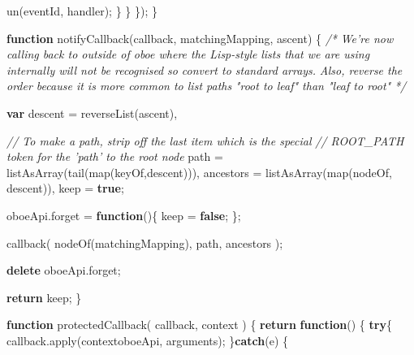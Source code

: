 \documentclass[]{article}
\newenvironment{Shaded}{}{}
\newcommand{\KeywordTok}[1]{\textcolor[rgb]{0.00,0.44,0.13}{\textbf{{#1}}}}
\newcommand{\CommentTok}[1]{\textcolor[rgb]{0.38,0.63,0.69}{\textit{{#1}}}}
\newcommand{\OtherTok}[1]{\textcolor[rgb]{0.00,0.44,0.13}{{#1}}}
\newcommand{\FunctionTok}[1]{\textcolor[rgb]{0.02,0.16,0.49}{{#1}}}
\newcommand{\NormalTok}[1]{{#1}}
\begin{document}
\begin{Shaded}
\begin{Highlighting}[]
               \FunctionTok{un}\NormalTok{(eventId, handler);}
            \NormalTok{\}}
         \NormalTok{\}}
      \NormalTok{\});   }
   \NormalTok{\}   }
   
   \KeywordTok{function} \FunctionTok{notifyCallback}\NormalTok{(callback, matchingMapping, ascent) \{}
      \CommentTok{/* }
\CommentTok{         We're now calling back to outside of oboe where the Lisp-style }
\CommentTok{         lists that we are using internally will not be recognised }
\CommentTok{         so convert to standard arrays. }
\CommentTok{  }
\CommentTok{         Also, reverse the order because it is more common to list paths }
\CommentTok{         "root to leaf" than "leaf to root" }
\CommentTok{      */}
            
      \KeywordTok{var} \NormalTok{descent     = }\FunctionTok{reverseList}\NormalTok{(ascent),}
      
          \CommentTok{// To make a path, strip off the last item which is the special}
          \CommentTok{// ROOT_PATH token for the 'path' to the root node}
          \NormalTok{path       = }\FunctionTok{listAsArray}\NormalTok{(}\FunctionTok{tail}\NormalTok{(}\FunctionTok{map}\NormalTok{(keyOf,descent))),}
          \NormalTok{ancestors  = }\FunctionTok{listAsArray}\NormalTok{(}\FunctionTok{map}\NormalTok{(nodeOf, descent)),}
          \NormalTok{keep       = }\KeywordTok{true}\NormalTok{;}
          
      \OtherTok{oboeApi}\NormalTok{.}\FunctionTok{forget} \NormalTok{= }\KeywordTok{function}\NormalTok{()\{}
         \NormalTok{keep = }\KeywordTok{false}\NormalTok{;}
      \NormalTok{\};           }
      
      \FunctionTok{callback}\NormalTok{( }\FunctionTok{nodeOf}\NormalTok{(matchingMapping), path, ancestors );         }
            
      \KeywordTok{delete} \OtherTok{oboeApi}\NormalTok{.}\FunctionTok{forget}\NormalTok{;}
      
      \KeywordTok{return} \NormalTok{keep;          }
   \NormalTok{\}}

   \KeywordTok{function} \FunctionTok{protectedCallback}\NormalTok{( callback, context ) \{}
      \KeywordTok{return} \KeywordTok{function}\NormalTok{() \{}
         \KeywordTok{try}\NormalTok{\{      }
            \OtherTok{callback}\NormalTok{.}\FunctionTok{apply}\NormalTok{(context\textbar{}\textbar{}oboeApi, arguments);   }
         \NormalTok{\}}\KeywordTok{catch}\NormalTok{(e)  \{}
         

\end{Highlighting}
\end{Shaded}
\end{document}
